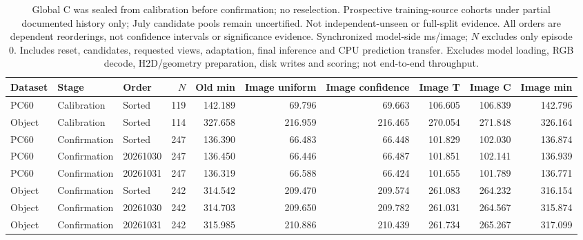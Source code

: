 \begin{table}[t]
\caption{Global C was sealed from calibration before confirmation; no reselection. Prospective training-source cohorts under partial documented history only; July candidate pools remain uncertified. Not independent-unseen or full-split evidence. All orders are dependent reorderings, not confidence intervals or significance evidence. Synchronized model-side ms/image; $N$ excludes only episode 0. Includes reset, candidates, requested views, adaptation, final inference and CPU prediction transfer. Excludes model loading, RGB decode, H2D/geometry preparation, disk writes and scoring; not end-to-end throughput.}
\centering\scriptsize
\begin{tabular}{@{}lllrrrrrrr@{}}
\toprule
Dataset & Stage & Order & $N$ & Old min & Image uniform & Image confidence & Image T & Image C & Image min \\
\midrule
PC60 & Calibration & Sorted & 119 & 142.189 & 69.796 & 69.663 & 106.605 & 106.839 & 142.796 \\
Object & Calibration & Sorted & 114 & 327.658 & 216.959 & 216.465 & 270.054 & 271.848 & 326.164 \\
PC60 & Confirmation & Sorted & 247 & 136.390 & 66.483 & 66.448 & 101.829 & 102.030 & 136.874 \\
PC60 & Confirmation & 20261030 & 247 & 136.450 & 66.446 & 66.487 & 101.851 & 102.141 & 136.939 \\
PC60 & Confirmation & 20261031 & 247 & 136.319 & 66.588 & 66.424 & 101.655 & 101.789 & 136.771 \\
Object & Confirmation & Sorted & 242 & 314.542 & 209.470 & 209.574 & 261.083 & 264.232 & 316.154 \\
Object & Confirmation & 20261030 & 242 & 314.703 & 209.650 & 209.782 & 261.031 & 264.567 & 315.874 \\
Object & Confirmation & 20261031 & 242 & 315.985 & 210.886 & 210.439 & 261.734 & 265.267 & 317.099 \\
\bottomrule
\end{tabular}
\end{table}
